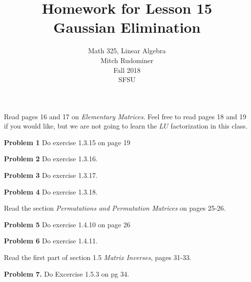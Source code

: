 \documentclass[oneside,12pt]{amsart}
\begin{document}
\title{Homework for Lesson 15 \\ Gaussian Elimination}
\author{Math 325, Linear Algebra \\ Mitch Rudominer \\ Fall 2018 \\ SFSU }
\date{}

\maketitle

\bigskip

Read pages 16 and 17 on \emph{Elementary Matrices}. Feel free to read pages
18 and 19 if you would like, but we are not going to learn the $LU$
factorization in this class.

\textbf{Problem 1} Do exercise 1.3.15 on page 19

\bigskip
\bigskip
\bigskip
\bigskip
\bigskip
\bigskip
\bigskip
\bigskip
\bigskip
\bigskip

\textbf{Problem 2} Do exercise 1.3.16.


\bigskip
\bigskip
\bigskip
\bigskip
\bigskip
\bigskip
\bigskip
\bigskip
\bigskip
\bigskip

\textbf{Problem 3} Do exercise 1.3.17.

\bigskip
\bigskip
\bigskip
\bigskip
\bigskip
\bigskip
\bigskip
\bigskip
\bigskip
\bigskip

\textbf{Problem 4} Do exercise 1.3.18.

\bigskip
\bigskip
\bigskip
\bigskip
\bigskip
\bigskip
\bigskip
\bigskip
\bigskip
\bigskip

Read the section \emph{Permutations and Permutation Matrices} on pages 25-26.

\medskip

\textbf{Problem 5} Do exercise 1.4.10 on page 26

\bigskip
\bigskip
\bigskip
\bigskip
\bigskip
\bigskip
\bigskip
\bigskip
\bigskip
\bigskip

\textbf{Problem 6} Do exercise 1.4.11.


\bigskip
\bigskip
\bigskip
\bigskip
\bigskip
\bigskip
\bigskip
\bigskip
\bigskip
\bigskip


Read the first part of section 1.5 \emph{Matrix Inverses}, pages 31-33.

\medskip

\textbf{Problem 7.} Do Excercise 1.5.3 on pg 34.

\bigskip
\bigskip
\bigskip
\bigskip
\bigskip
\bigskip
\bigskip
\bigskip
\bigskip
\bigskip
\end{document}
